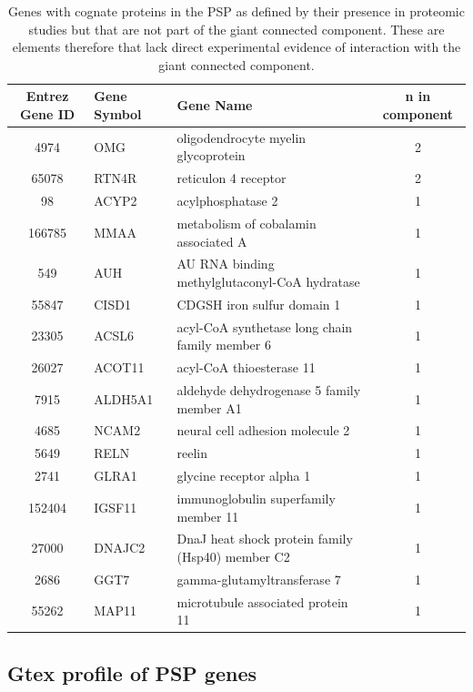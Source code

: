\begin{table}[ht]
\centering
\begin{tabular}{cllc}
\toprule
 
Entrez Gene ID & Gene Symbol & Gene Name & n in component \\ 
\midrule
 4974 & OMG & oligodendrocyte myelin glycoprotein & 2 \\ 
  65078 & RTN4R & reticulon 4 receptor & 2 \\ 
 98 & ACYP2 & acylphosphatase 2 & 1 \\ 
  166785 & MMAA & metabolism of cobalamin associated A & 1 \\ 
  549 & AUH & AU RNA binding methylglutaconyl-CoA hydratase & 1 \\ 
  55847 & CISD1 & CDGSH iron sulfur domain 1 & 1 \\ 
  23305 & ACSL6 & acyl-CoA synthetase long chain family member 6 & 1 \\ 
  26027 & ACOT11 & acyl-CoA thioesterase 11 & 1 \\ 
  7915 & ALDH5A1 & aldehyde dehydrogenase 5 family member A1 & 1 \\ 
  4685 & NCAM2 & neural cell adhesion molecule 2 & 1 \\ 
 
  5649 & RELN & reelin & 1 \\ 
  2741 & GLRA1 & glycine receptor alpha 1 & 1 \\ 
  152404 & IGSF11 & immunoglobulin superfamily member 11 & 1 \\ 
 
  27000 & DNAJC2 & DnaJ heat shock protein family (Hsp40) member C2 & 1 \\ 
  2686 & GGT7 & gamma-glutamyltransferase 7 & 1 \\ 
  55262 & MAP11 & microtubule associated protein 11 & 1 \\ 
   \bottomrule
\end{tabular}
\caption{Genes with cognate proteins in the PSP as defined by their presence in proteomic studies but that are not part of the giant connected component. These are elements therefore that lack direct experimental evidence of interaction with the giant connected component. } 
\label{table:notinLCC}
\end{table}


\subsection{Gtex profile of PSP genes}
